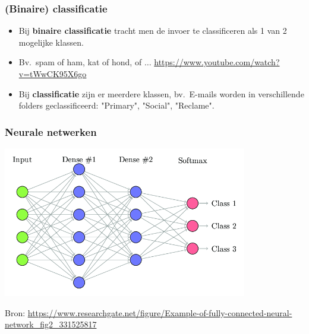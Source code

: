 \documentclass[aspectratio=169]{beamer}
\begin{document}
\begin{frame}
	\frametitle{(Binaire) classificatie}
	\begin{itemize}
		\item Bij \textbf{binaire classificatie} tracht men de invoer te classificeren als 1 van 2 mogelijke klassen.
		\item Bv.\ spam of ham, kat of hond, of $\ldots$ \url{https://www.youtube.com/watch?v=tWwCK95X6go}
		\item Bij \textbf{classificatie} zijn er meerdere klassen, bv.\ E-mails worden in verschillende 
		folders geclassificeerd: "Primary", "Social", "Reclame".
	\end{itemize}
\end{frame}

\begin{frame}
\frametitle{Neurale netwerken}

\begin{center}
\includegraphics[width=0.8\textwidth]{graphics/fully-connected-neural-network}
\end{center}

\tiny{Bron: \url{https://www.researchgate.net/figure/Example-of-fully-connected-neural-network_fig2_331525817}} 
\end{frame}
\end{document}
